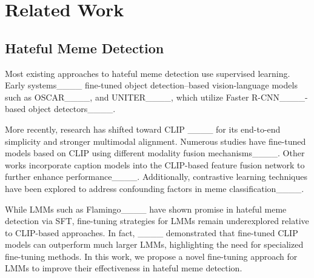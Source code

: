 \section{Related Work}
\subsection{Hateful Meme Detection}
Most existing approaches to hateful meme detection use supervised learning. Early systems____ fine-tuned object detection–based vision-language models such as OSCAR____, and UNITER____, which utilize Faster R-CNN____-based object detectors____. 

More recently, research has shifted toward CLIP ____ for its end-to-end simplicity and stronger multimodal alignment. Numerous studies have fine-tuned models based on CLIP using different modality fusion mechanisms____. Other works incorporate caption models into the CLIP-based feature fusion network to further enhance performance____. Additionally, contrastive learning techniques have been explored to address confounding factors in meme classification____. %

While LMMs such as Flamingo____ have shown promise in hateful meme detection via SFT, fine-tuning strategies for LMMs remain underexplored relative to CLIP-based approaches. In fact, ____ demonstrated that fine-tuned CLIP models can outperform much larger LMMs, highlighting the need for specialized fine-tuning methods. In this work, we propose a novel fine-tuning approach for LMMs to improve their effectiveness in hateful meme detection.  

